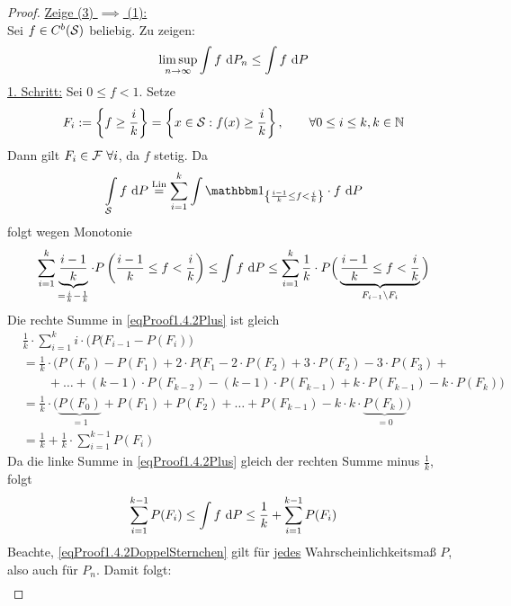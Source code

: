 \begin{proof}
\underline{Zeige (3) $\implies$ (1):}\\
Sei $f\in C^b(\S)$ beliebig. Zu zeigen:
\begin{align}\label{eqProof1.4.2Sternchen}
\limsup\limits_{n\to\infty}\int\limits f\d P_n\leq\int\limits f\d P
\end{align}
\underline{1. Schritt:} Sei $0\leq f<1$. Setze
\begin{align*}
F_i:=\left\lbrace f\geq\frac{i}{k}\right\rbrace=\left\lbrace x\in\S:f(x)\geq\frac{i}{k}\right\rbrace,\qquad \forall 0\leq i\leq k,k\in\N
\end{align*}
Dann gilt $F_i\in\F~\forall i$, da $f$ stetig. Da 
\begin{align*}
\int\limits_{\S}f\d P
\stackeq{\text{Lin}}
\sum\limits_{i=1}^k\int\limits\indi_{\left\lbrace\frac{i-1}{k}\leq f<\frac{i}{k}\right\rbrace}\cdot f\d P
\end{align*}
folgt wegen Monotonie
\begin{align}\label{eqProof1.4.2Plus}
\sum\limits_{i=1}^k\underbrace{\frac{i-1}{k}}_{=\frac{i}{k}-\frac{1}{k}}\cdot P\left(\frac{i-1}{k}\leq f<\frac{i}{k}\right)
\leq
\int\limits f\d P
\leq
\sum\limits_{i=1}^k \frac{1}{k}\cdot P\Big(\underbrace{\frac{i-1}{k}\leq f<\frac{i}{k}}_{F_{i-1}\setminus F_i}\Big)
\end{align}
Die rechte Summe in \eqref{eqProof1.4.2Plus} ist gleich
\begin{align*}
&\frac{1}{k}\cdot\sum\limits_{i=1}^k i\cdot\big( P(F_{i-1}-P(F_i)\big)\\
&=\frac{1}{k}\cdot\Big(P(F_0)-P(F_1)+2\cdot P(F_1-2\cdot P(F_2)+3\cdot P(F_2)-3\cdot P(F_3)+\\
&\qquad+\ldots+(k-1)\cdot P(F_{k-2})-(k-1)\cdot P(F_{k-1})+k\cdot P(F_{k-1})-k\cdot P(F_k)\Big)\\
&=\frac{1}{k}\cdot\Big(\underbrace{P(F_0)}_{=1}+P(F_1)+P(F_2)+\ldots+P(F_{k-1})-k\cdot k\cdot \underbrace{P(F_k)}_{=0}\Big)\\
&=\frac{1}{k}+\frac{1}{k}\cdot\sum\limits_{i=1}^{k-1} P(F_i)
\end{align*}
Da die linke Summe in \eqref{eqProof1.4.2Plus} gleich der rechten Summe minus $\frac{1}{k}$, folgt
\begin{align}\label{eqProof1.4.2DoppelSternchen}
\sum\limits_{i=1}^{k-1} P(F_i)
\leq\int\limits f\d P
\leq\frac{1}{k}+\sum\limits_{i=1}^{k-1} P(F_i)
\end{align}
Beachte, \eqref{eqProof1.4.2DoppelSternchen} gilt für \ul{jedes} Wahrscheinlichkeitsmaß $P$, also auch für $P_n$. Damit folgt:
\begin{align*}

\end{align*}
\end{proof}
